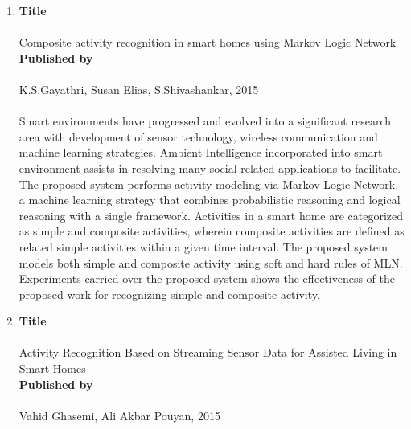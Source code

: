 \begin{enumerate}
	\item
		\textbf{Title}
			\paragraph{}Composite activity recognition in smart homes using Markov Logic Network\\
		
		\textbf{Published by}
			\paragraph{}K.S.Gayathri, Susan Elias, S.Shivashankar, 2015
			\paragraph{}Smart environments have progressed and evolved into a significant research area with development of sensor technology, wireless communication and machine learning strategies. Ambient Intelligence incorporated into smart environment assists in resolving many social related applications to facilitate. The proposed system performs activity modeling via Markov Logic Network, a machine learning strategy that combines probabilistic reasoning and logical reasoning with a single framework. Activities in a smart home are categorized as simple and composite activities, wherein composite activities are defined as related simple activities within a given time interval. The proposed system models both simple and composite activity using soft and hard rules of MLN. Experiments carried over the proposed system shows the effectiveness of the proposed work for recognizing simple and composite activity.\\
			
	\item
		\textbf{Title}
			\paragraph{}Activity Recognition Based on Streaming Sensor Data for Assisted Living in Smart Homes\\
		
		\textbf{Published by}
			\paragraph{}Vahid Ghasemi, Ali Akbar Pouyan, 2015

\end{enumerate}

